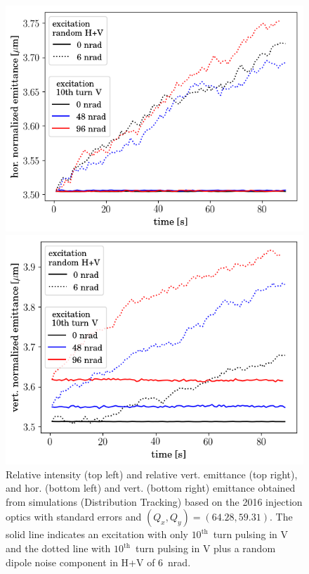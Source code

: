 \documentclass[%
 reprint,
 amsmath,amssymb,
 aps,
prstab,
]{revtex4-1}
\begin{document}
\begin{figure}[h]
\begin{minipage}[t]{0.49\linewidth}
	\end{minipage}
	\begin{minipage}[t]{0.49\linewidth}
		\centering
		\includegraphics[width=1.0\linewidth]{2016injerra2b2uran1_2e-3_10thV_3_5um_emit1.png}
	\end{minipage}	
	\begin{minipage}[t]{0.49\linewidth}
		\centering
		\includegraphics[width=1.0\linewidth]{2016injerra2b2uran1_2e-3_10thV_3_5um_emit2.png}
	\end{minipage}	
	\caption{\label{fig:10thsim} Relative intensity (top left) and relative vert. emittance (top right), and hor. (bottom left) and vert. (bottom right) emittance obtained from simulations (Distribution Tracking) based on the 2016 injection optics with standard errors and $(Q_x,Q_y)=(64.28,59.31)$. The solid line indicates an excitation with only $10^{\mathrm{th}}$~turn pulsing in V and the dotted line with $10^{\mathrm{th}}$~turn pulsing in V plus a random dipole noise component in H+V of 6~nrad.}
\end{figure}
\end{document}
